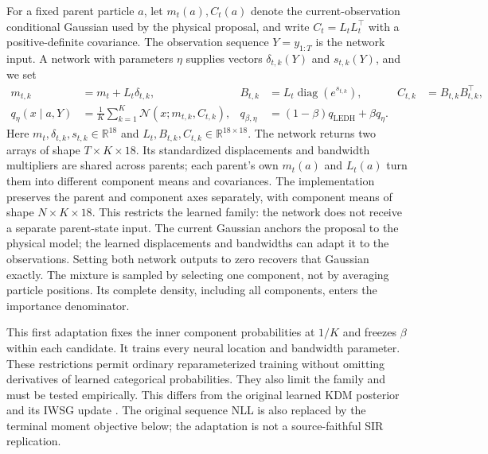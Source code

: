 For a fixed parent particle \(a\), let \(m_t(a),C_t(a)\) denote the
current-observation conditional Gaussian used by the physical proposal, and
write \(C_t=L_tL_t^\top\) with a positive-definite covariance. The observation
sequence \(Y=y_{1:T}\) is the network input. A network with parameters
\(\eta\) supplies vectors \(\delta_{t,k}(Y)\) and \(s_{t,k}(Y)\), and we set
\begin{align}
 m_{t,k}&=m_t+L_t\delta_{t,k},&
 B_{t,k}&=L_t\operatorname{diag}(e^{s_{t,k}}),&
 C_{t,k}&=B_{t,k}B_{t,k}^{\top},\label{eq:sir-neural-components}\\
 q_\eta(x\mid a,Y)&=\frac1K\sum_{k=1}^K
       \mathcal N(x;m_{t,k},C_{t,k}),&
 q_{\beta,\eta}&=(1-\beta)q_{\mathrm{LEDH}}+\beta q_\eta.
       \label{eq:sir-neural-proposal}
\end{align}
Here \(m_t,\delta_{t,k},s_{t,k}\in\mathbb R^{18}\) and
\(L_t,B_{t,k},C_{t,k}\in\mathbb R^{18\times18}\). The network returns two
arrays of shape \(T\times K\times18\). Its standardized displacements and
bandwidth multipliers are shared across parents; each parent's own \(m_t(a)\)
and \(L_t(a)\) turn them into different component means and covariances.
The implementation preserves the parent and component axes separately,
with component means of shape \(N\times K\times18\). This restricts the
learned family: the network does not receive a separate parent-state input.
The current Gaussian anchors the proposal to the physical model; the learned
displacements and bandwidths can adapt it to the observations. Setting both
network outputs to zero recovers that Gaussian exactly. The mixture is sampled
by selecting one component, not by averaging particle positions. Its complete
density, including all components, enters the importance denominator.

This first adaptation fixes the inner component probabilities at \(1/K\)
and freezes \(\beta\) within each candidate. It trains every neural location
and bandwidth parameter. These restrictions permit ordinary reparameterized
training without omitting derivatives of learned categorical probabilities.
They also limit the family and must be tested empirically. This differs from
the original learned KDM posterior and its IWSG update
\citep[Section~4, equations~(14)--(15)]{younis2023}.
The original sequence NLL is also replaced by the terminal moment objective
below; the adaptation is not a source-faithful SIR replication.

